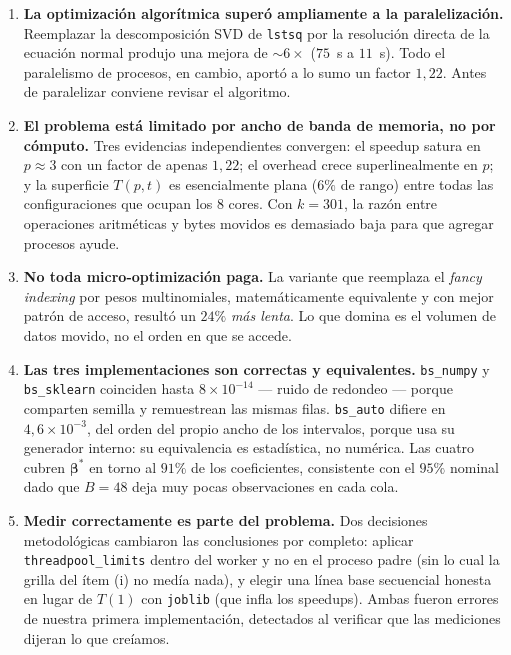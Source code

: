 \documentclass[11pt,letterpaper]{article}
\begin{document}
\begin{enumerate}
\item \textbf{La optimización algorítmica superó ampliamente a la paralelización.}
  Reemplazar la descomposición SVD de \texttt{lstsq} por la resolución directa de la
  ecuación normal produjo una mejora de $\sim 6\times$ ($75$~s a $11$~s). Todo el
  paralelismo de procesos, en cambio, aportó a lo sumo un factor $1{,}22$. Antes de
  paralelizar conviene revisar el algoritmo.

\item \textbf{El problema está limitado por ancho de banda de memoria, no por cómputo.}
  Tres evidencias independientes convergen: el speedup satura en $p \approx 3$ con un
  factor de apenas $1{,}22$; el overhead crece superlinealmente en $p$; y la superficie
  $T(p,t)$ es esencialmente plana ($6\%$ de rango) entre todas las configuraciones que
  ocupan los 8 cores. Con $k = 301$, la razón entre operaciones aritméticas y bytes
  movidos es demasiado baja para que agregar procesos ayude.

\item \textbf{No toda micro-optimización paga.} La variante que reemplaza el
  \textit{fancy indexing} por pesos multinomiales, matemáticamente equivalente y con mejor
  patrón de acceso, resultó un $24\%$ \emph{más lenta}. Lo que domina es el volumen de
  datos movido, no el orden en que se accede.

\item \textbf{Las tres implementaciones son correctas y equivalentes.}
  \texttt{bs\_numpy} y \texttt{bs\_sklearn} coinciden hasta $8 \times 10^{-14}$ --- ruido
  de redondeo --- porque comparten semilla y remuestrean las mismas filas.
  \texttt{bs\_auto} difiere en $4{,}6 \times 10^{-3}$, del orden del propio ancho de los
  intervalos, porque usa su generador interno: su equivalencia es estadística, no
  numérica. Las cuatro cubren $\boldsymbol{\beta}^*$ en torno al $91\%$ de los
  coeficientes, consistente con el $95\%$ nominal dado que $B = 48$ deja muy pocas
  observaciones en cada cola.

\item \textbf{Medir correctamente es parte del problema.} Dos decisiones metodológicas
  cambiaron las conclusiones por completo: aplicar \texttt{threadpool\_limits} dentro del
  worker y no en el proceso padre (sin lo cual la grilla del ítem (i) no medía nada), y
  elegir una línea base secuencial honesta en lugar de $T(1)$ con \texttt{joblib} (que
  infla los speedups). Ambas fueron errores de nuestra primera implementación, detectados
  al verificar que las mediciones dijeran lo que creíamos.
\end{enumerate}
\end{document}
